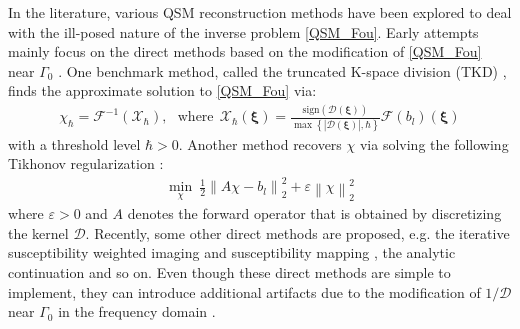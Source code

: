 \documentclass[reqno]{siamonline1116}
\numberwithin{theorem}{section}
\numberwithin{equation}{section}
\def\f{\frac}
\def\mD{{\mathcal D}}
\def\mX{{\mathcal X}}
\def\msF{{\mathscr F}}
\def\xxi{{\boldsymbol{\xi}}}
\newcommand{\eps}{\varepsilon}
\begin{document}
In the literature, various QSM reconstruction methods have been explored to deal with the ill-posed nature of the inverse problem \cref{QSM_Fou}. Early attempts mainly focus on the direct methods based on the modification of \cref{QSM_Fou} near $\Gamma_0$ \cite{Y.Kee2017}. One benchmark method, called the truncated K-space division (TKD) \cite{K.Shmueli2009}, finds the approximate solution to \cref{QSM_Fou} via:
\begin{align}\label{TKD}
\chi_{\hbar}=\msF^{-1}(\mX_{\hbar}),~~~\text{where}~~\mX_{\hbar}(\xxi)=\f{\mathrm{sign}(\mD(\xxi))}{\max\left\{|\mD(\xxi)|,\hbar\right\}}\msF(b_l)(\xxi)
\end{align}
with a threshold level $\hbar>0$. Another method recovers $\chi$ via solving the following Tikhonov regularization \cite{B.Kressler2010}:
\begin{align}\label{Tikhonov}
\min_{\chi}~\f{1}{2}\left\|A\chi-b_l\right\|_2^2+\eps\left\|\chi\right\|_2^2
\end{align}
where $\eps>0$ and $A$ denotes the forward operator that is obtained by discretizing the kernel $\mD$. Recently, some other direct methods are proposed, e.g. the iterative susceptibility weighted imaging and susceptibility mapping \cite{J.Tang2013}, the analytic continuation \cite{Natterer2016} and so on. Even though these direct methods are simple to implement, they can introduce additional artifacts due to the modification of $1/\mD$ near $\Gamma_0$ in the frequency domain \cite{J.K.Choi2014,Y.Kee2017,B.Palacios2017}.
\end{document}
